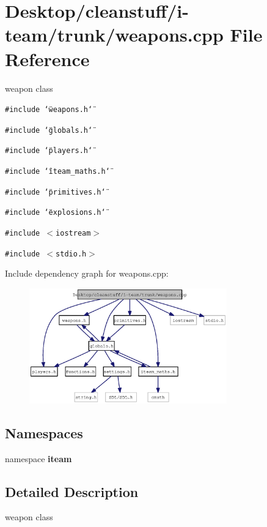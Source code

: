 \section{Desktop/cleanstuff/i-team/trunk/weapons.cpp File Reference}
\label{weapons_8cpp}
weapon class 

{\tt \#include \char`\"{}weapons.h\char`\"{}}\par
{\tt \#include \char`\"{}globals.h\char`\"{}}\par
{\tt \#include \char`\"{}players.h\char`\"{}}\par
{\tt \#include \char`\"{}iteam\_\-maths.h\char`\"{}}\par
{\tt \#include \char`\"{}primitives.h\char`\"{}}\par
{\tt \#include \char`\"{}explosions.h\char`\"{}}\par
{\tt \#include $<$iostream$>$}\par
{\tt \#include $<$stdio.h$>$}\par


Include dependency graph for weapons.cpp:\nopagebreak
\begin{figure}[H]
\begin{center}
\leavevmode
\includegraphics[width=242pt]{weapons_8cpp__incl}
\end{center}
\end{figure}
\subsection*{Namespaces}
\begin{CompactItemize}
\item 
namespace {\bf iteam}
\end{CompactItemize}


\subsection{Detailed Description}
weapon class 

